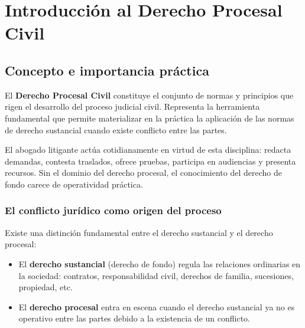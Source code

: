 \documentclass[12pt,oneside]{book}
\begin{document}

\tableofcontents

\clearpage


\chapter{Introducción al Derecho Procesal Civil}

\section{Concepto e importancia práctica}

El \textbf{Derecho Procesal Civil} constituye el conjunto de normas y principios que rigen el desarrollo del proceso judicial civil. Representa la herramienta fundamental que permite materializar en la práctica la aplicación de las normas de derecho sustancial cuando existe conflicto entre las partes.

El abogado litigante actúa cotidianamente en virtud de esta disciplina: redacta demandas, contesta traslados, ofrece pruebas, participa en audiencias y presenta recursos. Sin el dominio del derecho procesal, el conocimiento del derecho de fondo carece de operatividad práctica.

\subsection{El conflicto jurídico como origen del proceso}

Existe una distinción fundamental entre el derecho sustancial y el derecho procesal:

\begin{itemize}
    \item El \textbf{derecho sustancial} (derecho de fondo) regula las relaciones ordinarias en la sociedad: contratos, responsabilidad civil, derechos de familia, sucesiones, propiedad, etc.
    \item El \textbf{derecho procesal} entra en escena cuando el derecho sustancial ya no es operativo entre las partes debido a la existencia de un conflicto.
\end{itemize}
\end{document}
